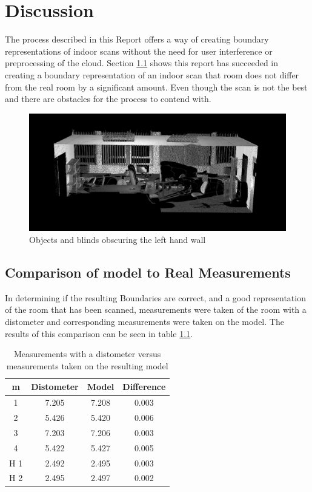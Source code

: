 \chapter{Discussion}
	\label{discussion}
	The process described in this Report offers a way of creating boundary representations of indoor scans without the need for user interference or preprocessing of the cloud. Section \ref{Comparison} shows this report has succeeded in creating a boundary representation of an indoor scan that room does not differ from the real room by a significant amount. Even though the scan is not the best and there are obstacles for the process to contend with. 
	
	\begin{figure}[H]
	\centering
	\includegraphics[width=0.9\linewidth]{"Includes/images/Results/Messy Wall"}
	\caption{Objects and blinds obscuring the left hand wall}
	\label{fig:MessyWall}
	\end{figure}
	
	
	\section{Comparison of model to Real Measurements}
		\label{Comparison}
		In determining if the resulting Boundaries are correct, and a good representation of the room that has been scanned, measurements were taken of the room with a distometer and corresponding measurements were taken on the model. The results of this comparison can be seen in table \ref{MeasurmensTable}. 
		
		\begin{table}[H]
			\centering
			\begin{tabular}{|c|c c c|}
				\hline m & Distometer & Model & Difference \\ 
				\hline 1 & 7.205 & 7.208 & 0.003 \\ 
				\hline 2 & 5.426 & 5.420 & 0.006 \\ 
				\hline 3 & 7.203 & 7.206 & 0.003 \\ 
				\hline 4 & 5.422 & 5.427 & 0.005 \\ 
				\hline H 1 & 2.492 & 2.495 & 0.003 \\ 
				\hline H 2 & 2.495 & 2.497 & 0.002 \\ 
				\hline
			\end{tabular}
			\caption{Measurements with a distometer versus measurements taken on the resulting model}
			\label{MeasurmensTable}
		\end{table}
		
